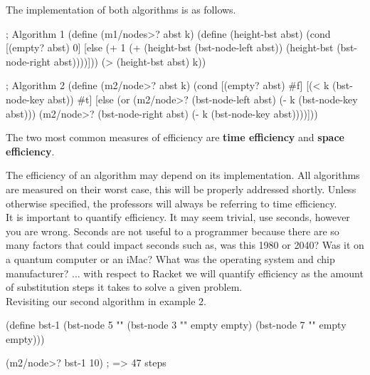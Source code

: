 \clearpage
The implementation of both algorithms is as follows.\\

\begin{code}[Lisp]
; Algorithm 1
(define (m1/nodes>? abst k)
	(define (height-bst abst)
		(cond
			[(empty? abst) 0]
			[else (+ 1 (+ (height-bst (bst-node-left abst))
			              (height-bst (bst-node-right abst))))]))
	(> (height-bst abst) k))

; Algorithm 2
(define (m2/node>? abst k)
	(cond
		[(empty? abst) #f]
		[(< k (bst-node-key abst)) #t]
		[else (or (m2/node>? (bst-node-left abst) (- k (bst-node-key abst)))
		          (m2/node>? (bst-node-right abst) (- k (bst-node-key abst))))]))
\end{code}



The two most common measures of efficiency are \textbf{time efficiency} and \textbf{space efficiency}.\\



The efficiency of an algorithm may depend on its implementation. All algorithms are measured on their worst case, this will be properly addressed shortly. Unless otherwise specified, the professors will always be referring to time efficiency.\\

It is important to quantify efficiency. It may seem trivial, use seconds, however you are wrong. Seconds are not useful to a programmer because there are so many factors that could impact seconds such as, was this 1980 or 2040? Was it on a quantum computer or an iMac? What was the operating system and chip manufacturer? ... with respect to Racket we will quantify efficiency as the amount of substitution steps it takes to solve a given problem.\\

Revisiting our second algorithm in example 2.\\

\begin{code}[Lisp]
(define bst-1 (bst-node 5 "" (bst-node 3 "" empty empty)
                             (bst-node 7 "" empty empty)))

(m2/node>? bst-1 10) ; => 47 steps
\end{code}

